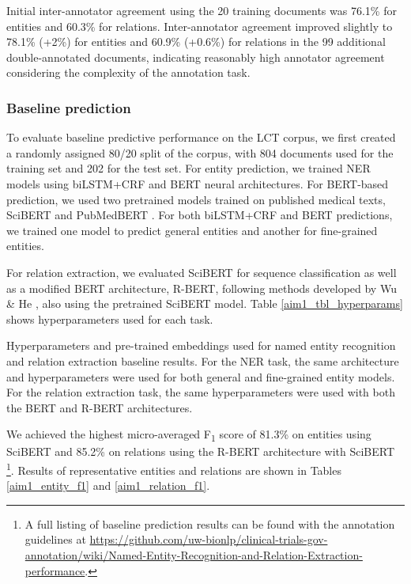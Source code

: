 \documentclass[../main.tex]{subfiles}
\begin{document}
Initial inter-annotator agreement using the 20 training documents was 76.1\% for entities and 60.3\% for relations. Inter-annotator agreement improved slightly to 78.1\% (+2\%) for entities and 60.9\% (+0.6\%) for relations in the 99 additional double-annotated documents, indicating reasonably high annotator agreement considering the complexity of the annotation task.

\subsubsection{Baseline prediction}
To evaluate baseline predictive performance on the LCT corpus, we first created a randomly assigned 80/20 split of the corpus, with 804 documents used for the training set and 202 for the test set. For entity prediction, we trained NER models using biLSTM+CRF and BERT \cite{devlin2018bert} neural architectures. For BERT-based prediction, we used two pretrained models trained on published medical texts, SciBERT \cite{beltagy2019scibert} and PubMedBERT \cite{gu2021domain}. For both biLSTM+CRF and BERT predictions, we trained one model to predict general entities and another for fine-grained entities. 

For relation extraction, we evaluated SciBERT for sequence classification as well as a modified BERT architecture, R-BERT, following methods developed by Wu \& He \cite{wu2019enriching}, also using the pretrained SciBERT model. Table \ref{aim1_tbl_hyperparams} shows hyperparameters used for each task.

\def\arraystretch{1.2}
\begin{table}[h!]
  \centering
  \def\arraystretch{1}
  \footnotesize
  
  \caption{Hyperparameters and pre-trained embeddings used for named entity recognition and relation extraction baseline results. For the NER task, the same architecture and hyperparameters were used for both general and fine-grained entity models. For the relation extraction task, the same hyperparameters were used with both the BERT and R-BERT architectures.}
  \label{aim1_tbl_hyperparams}
\end{table}

We achieved the highest micro-averaged F\textsubscript{1} score of 81.3\% on entities using SciBERT and 85.2\% on relations using the R-BERT architecture with SciBERT \footnote{A full listing of baseline prediction results can be found with the annotation guidelines at \url{https://github.com/uw-bionlp/clinical-trials-gov-annotation/wiki/Named-Entity-Recognition-and-Relation-Extraction-performance}. }. Results of representative entities and relations are shown in Tables \ref{aim1_entity_f1} and \ref{aim1_relation_f1}.
\end{document}
